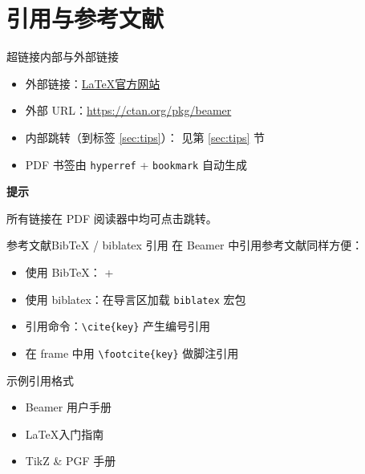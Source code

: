 \documentclass[UTF8,11pt,aspectratio=169]{beamer}
\newcommand{\latex}{\LaTeX}                  %
\newenvironment{tip}{
    \begin{exampleblock}{\textbf{\twemoji{light bulb} 提示}}
}{
    \end{exampleblock}
}
\begin{document}
\section{引用与参考文献}

\begin{frame}[fragile]{超链接}{内部与外部链接}
    \begin{itemize}
        \item 外部链接：\href{https://www.latex-project.org}{\latex 官方网站}
        \item 外部 URL：\url{https://ctan.org/pkg/beamer}
        \item 内部跳转（到标签 \ref{sec:tips}）：
              见第 \ref{sec:tips} 节
        \item PDF 书签由 \verb|hyperref| + \verb|bookmark| 自动生成
    \end{itemize}

    \begin{tip}
        所有链接在 PDF 阅读器中均可点击跳转。
    \end{tip}
\end{frame}

\begin{frame}[fragile]{参考文献}{BibTeX / biblatex 引用}
    在 Beamer 中引用参考文献同样方便：

    \begin{itemize}
        \item 使用 BibTeX：\verb|| + \verb||
        \item 使用 biblatex：在导言区加载 \verb|biblatex| 宏包
        \item 引用命令：\verb|\cite{key}| 产生编号引用
        \item 在 frame 中用 \verb|\footcite{key}| 做脚注引用
    \end{itemize}

    \begin{block}{示例引用格式}
        \begin{itemize}
            \item Beamer 用户手册~\cite{beamer-manual}
            \item \latex 入门指南~\cite{latex-guide}
            \item TikZ \& PGF 手册~\cite{tikz-manual}
        \end{itemize}
    \end{block}
\end{frame}
\end{document}
